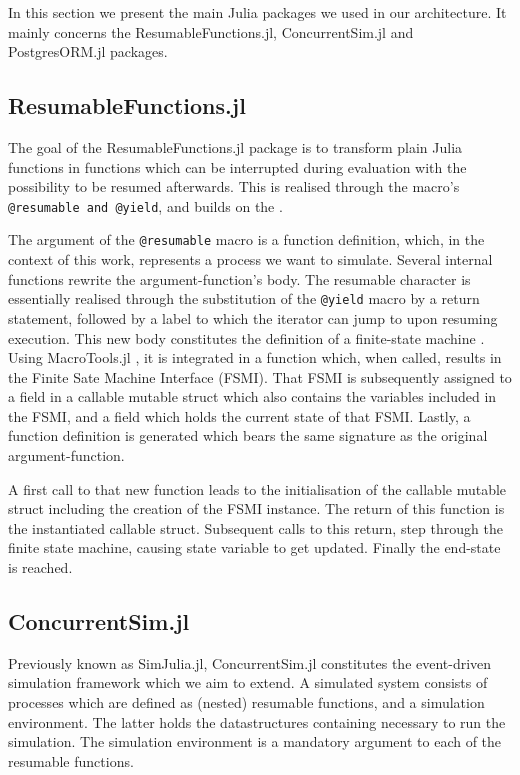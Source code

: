 \documentclass{juliacon}
\begin{document}
In this section we present the main Julia packages we used in our architecture. It mainly concerns the ResumableFunctions.jl, ConcurrentSim.jl and PostgresORM.jl packages.\vskip 6pt

\subsection{ResumableFunctions.jl}

The goal of the ResumableFunctions.jl package is to transform plain Julia functions in functions which can be interrupted during evaluation with the possibility to be resumed afterwards. This is realised through the macro's \texttt{@resumable and @yield}, and builds on the . \vskip 6pt

The argument of the \texttt{@resumable} macro is a function definition, which, in the context of this work, represents a process we want to simulate. Several internal functions rewrite the argument-function's body. The resumable character is essentially realised through the substitution of the \texttt{@yield} macro by a return statement, followed by a label to which the iterator can jump to upon resuming execution. This new body constitutes the definition of a finite-state machine \cite{todo}. Using MacroTools.jl \cite{todo}, it is integrated in a function which, when called, results in the Finite Sate Machine Interface (FSMI). That FSMI is subsequently assigned to a field in a callable mutable struct which also contains the variables included in the FSMI, and a field which holds the current state of that FSMI. Lastly, a function definition is generated which bears the same signature as the original argument-function. \vskip 6pt

A first call to that new function leads to the initialisation of the callable mutable struct including the creation of the FSMI instance. The return of this function is the instantiated callable struct. Subsequent calls to this return, step through the finite state machine, causing state variable to get updated. Finally the end-state is reached. \vskip 6pt

\subsection{ConcurrentSim.jl}

Previously known as SimJulia.jl, ConcurrentSim.jl constitutes the event-driven simulation framework which we aim to extend. A simulated system consists of processes which are defined as (nested) resumable functions, and a simulation environment. The latter holds the datastructures containing necessary to run the simulation. The simulation environment is a mandatory argument to each of the resumable functions. \vskip 6pt
\end{document}
